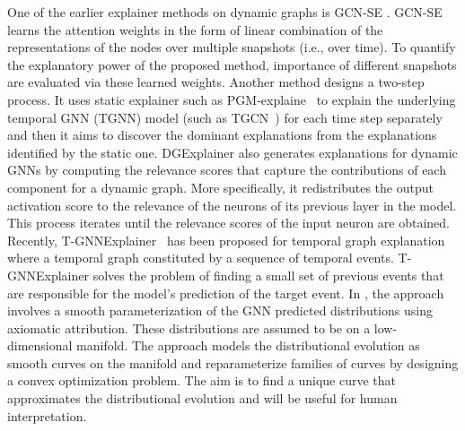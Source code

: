 One of the earlier explainer methods on dynamic graphs is GCN-SE \cite{fan2021gcn}. GCN-SE learns the attention weights in the form of linear combination of the representations of the nodes over multiple snapshots (i.e., over time). To quantify the explanatory power of the proposed method, importance of different snapshots are evaluated via these learned weights. Another method \cite{he2022explainer} designs a two-step process. It uses static explainer such as PGM-explaine~\cite{pgm-ex} to explain the underlying temporal GNN (TGNN) model (such as TGCN~\cite{zhao2019tgcn}) for each time step separately and then it aims to discover the dominant explanations from the explanations identified by the static one. DGExplainer \cite{xie2022explaining} also generates
explanations for dynamic GNNs by computing the
relevance scores that capture the contributions of each component for a dynamic graph. More specifically, it redistributes the output activation score to the relevance of the neurons of its previous layer in the model. This process iterates until the relevance scores of the input neuron are obtained. Recently, T-GNNExplainer~\cite{xiaexplaining} has been proposed for temporal graph explanation where a temporal graph constituted by a sequence of temporal events. T-GNNExplainer solves the problem of finding a small set of previous events that are responsible for the model's prediction of the target event. In \cite{liudifferential}, the approach involves a smooth parameterization of the GNN
predicted distributions using axiomatic attribution. These distributions are assumed to be on
a low-dimensional manifold. The approach models the distributional evolution as
smooth curves on the manifold and reparameterize families of curves by designing a convex optimization problem. The aim is to find a unique curve that
approximates the distributional evolution and will be useful for human interpretation.



